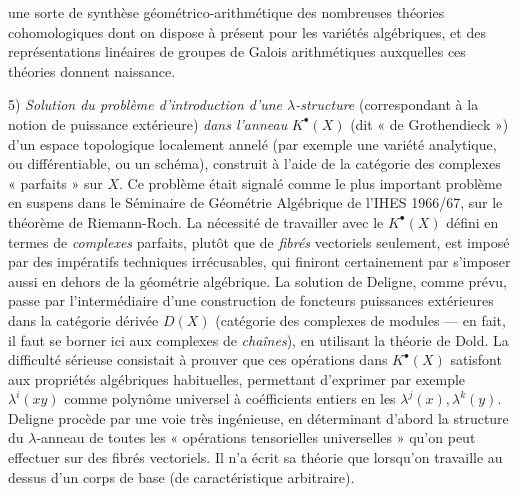 \documentclass[11pt,a4paper]{article}
\begin{document}

une sorte de synthèse géométrico-arithmétique des nombreuses théories
cohomologiques dont on dispose \struck{\ill{}} à présent pour les variétés
algébriques,  et des représentations linéaires
de groupes de Galois arithmétiques auxquelles ces théories donnent naissance.

5) \emph{Solution du problème d'introduction d'une $\lambda$-structure}
(correspondant à la notion de puissance extérieure) \emph{dans l'anneau}
$K^{\bullet}(X)$ (dit « de Grothendieck ») d'un espace topologique localement
annelé (par exemple une variété analytique, ou différentiable, ou un schéma),
construit à l'aide de la catégorie des complexes « parfaits » sur $X$. Ce
problème était signalé comme le plus important problème  en
suspens dans le Séminaire de Géométrie Algébrique de l'IHES 1966/67, sur le
théorème de Riemann-Roch. La nécessité de travailler avec le $K^{\bullet}(X)$
défini en termes de \emph{complexes} parfaits, plutôt que de \emph{fibrés}
vectoriels seulement, est imposé par des \struck{\ill{}} impératifs
techniques irrécusables, qui finiront certainement par s'imposer aussi en
dehors de la géométrie algébrique. La solution de Deligne, comme prévu, passe
par l'intermédiaire d'une construction de \struck{\ill{}} foncteurs puissances
extérieures dans la catégorie dérivée $D(X)$ (catégorie des complexes de
modules  --- en fait, il faut se borner ici aux complexes de
\emph{chaînes}), en utilisant la théorie de Dold. La difficulté
sérieuse consistait à prouver que ces opérations dans $K^{\bullet}(X)$
satisfont aux propriétés algébriques habituelles, permettant d'exprimer par
exemple $\lambda^{i}(xy)$ comme polynôme universel à coéfficients entiers en
les $\lambda^{j}(x), \lambda^{k}(y)$. Deligne procède par une voie très
ingénieuse, en déterminant d'abord la structure du $\lambda$-anneau de toutes
les « opérations tensorielles universelles » qu'on peut effectuer sur des
fibrés vectoriels. Il n'a écrit sa théorie que lorsqu'on travaille au dessus
d'un corps de base \struck{\ill{}} (de caractéristique arbitraire).
\end{document}
